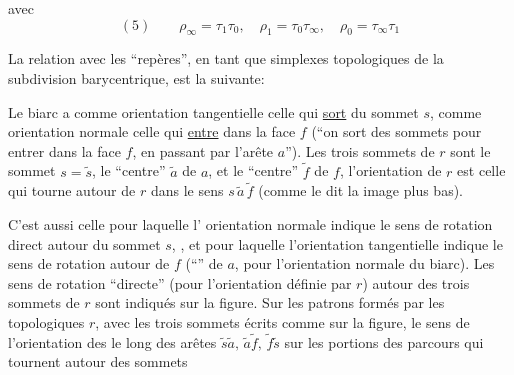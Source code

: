 avec
\[
(5)\qquad\rho_\infty=\tau_1\tau_0,\quad\rho_1=\tau_0\tau_\infty,\quad\rho_0=\tau_\infty\tau_1
\]

La relation avec les ``repères'', en tant que simplexes topologiques de la subdivision barycentrique, est la suivante:


Le biarc  a comme orientation tangentielle celle qui \uline{sort} du sommet $s$, comme orientation normale celle qui \uline{entre} dans la face $f$ (``on sort des sommets pour entrer dans la face $f$, en passant par l'arête $a$''). Les trois sommets de $r$ sont le sommet $s=\widetilde s$, le ``centre'' $\widetilde a$ de $a$, et le ``centre'' $\widetilde f$ de $f$, l'orientation de $r$ est celle qui tourne autour de $r$ dans le sens $s\,\widetilde a\,\widetilde f$ (comme le dit la  image plus bas).

C'est aussi celle pour laquelle l' orientation normale  indique le sens de rotation direct autour du sommet $s$, , et pour laquelle l'orientation tangentielle indique le sens de rotation autour de $f$ (``'' de $a$, pour l'orientation normale du biarc). Les sens de rotation ``directe'' (pour l'orientation définie par $r$) autour des trois sommets de $r$ sont indiqués sur la figure. Sur les patrons formés par les   topologiques $r$, avec les trois sommets écrits comme sur la figure, le sens de l'orientation des  le long des arêtes $\widetilde s\widetilde a,\,\widetilde a\widetilde f,\,\widetilde f\widetilde s$  sur les portions des parcours qui tournent autour des sommets

